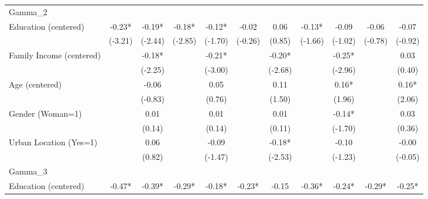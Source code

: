 {\begin{tabular*}{\hsize}{@{\hskip\tabcolsep\extracolsep\fill}l*{10}{c}}
\midrule
Gamma\_2             &             &             &             &             &             &             &             &             &             &             \\
Education (centered)&       -0.23*&       -0.19*&       -0.18*&       -0.12*&       -0.02 &        0.06 &       -0.13*&       -0.09 &       -0.06 &       -0.07 \\
                    &     (-3.21) &     (-2.44) &     (-2.85) &     (-1.70) &     (-0.26) &      (0.85) &     (-1.66) &     (-1.02) &     (-0.78) &     (-0.92) \\
Family Income (centered)&             &       -0.18*&             &       -0.21*&             &       -0.20*&             &       -0.25*&             &        0.03 \\
                    &             &     (-2.25) &             &     (-3.00) &             &     (-2.68) &             &     (-2.96) &             &      (0.40) \\
Age (centered)      &             &       -0.06 &             &        0.05 &             &        0.11 &             &        0.16*&             &        0.16*\\
                    &             &     (-0.83) &             &      (0.76) &             &      (1.50) &             &      (1.96) &             &      (2.06) \\
Gender (Woman=1)    &             &        0.01 &             &        0.01 &             &        0.01 &             &       -0.14*&             &        0.03 \\
                    &             &      (0.14) &             &      (0.14) &             &      (0.11) &             &     (-1.70) &             &      (0.36) \\
Urban Location (Yes=1)&             &        0.06 &             &       -0.09 &             &       -0.18*&             &       -0.10 &             &       -0.00 \\
                    &             &      (0.82) &             &     (-1.47) &             &     (-2.53) &             &     (-1.23) &             &     (-0.05) \\
\midrule
Gamma\_3             &             &             &             &             &             &             &             &             &             &             \\
Education (centered)&       -0.47*&       -0.39*&       -0.29*&       -0.18*&       -0.23*&       -0.15 &       -0.36*&       -0.24*&       -0.29*&       -0.25*\\

\end{tabular*}}
